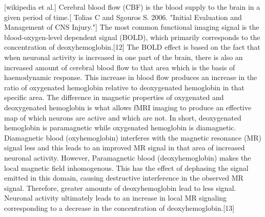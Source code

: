 [wikipedia et al.]
Cerebral blood flow (CBF) is the blood supply to the brain in a given period of time.[     Tolias C and Sgouros S. 2006. "Initial Evaluation and Management of CNS Injury."]
The most common functional imaging signal is the blood-oxygen-level dependent signal (BOLD), which primarily corresponds to the concentration of deoxyhemoglobin.[12] The BOLD effect is based on the fact that when neuronal activity is increased in one part of the brain, there is also an increased amount of cerebral blood flow to that area which is the basis of haemodynamic response. This increase in blood flow produces an increase in the ratio of oxygenated hemoglobin relative to deoxygenated hemoglobin in that specific area. The difference in magnetic properties of oxygenated and deoxygenated hemoglobin is what allows fMRI imaging to produce an effective map of which neurons are active and which are not. In short, deoxygenated hemoglobin is paramagnetic while oxygenated hemoglobin is diamagnetic. Diamagnetic blood (oxyhemoglobin) interferes with the magnetic resonance (MR) signal less and this leads to an improved MR signal in that area of increased neuronal activity. However, Paramagnetic blood (deoxyhemoglobin) makes the local magnetic field inhomogenous. This has the effect of dephasing the signal emitted in this domain, causing destructive interference in the observed MR signal. Therefore, greater amounts of deoxyhemoglobin lead to less signal. Neuronal activity ultimately leads to an increase in local MR signaling corresponding to a decrease in the concentration of deoxyhemoglobin.[13]
